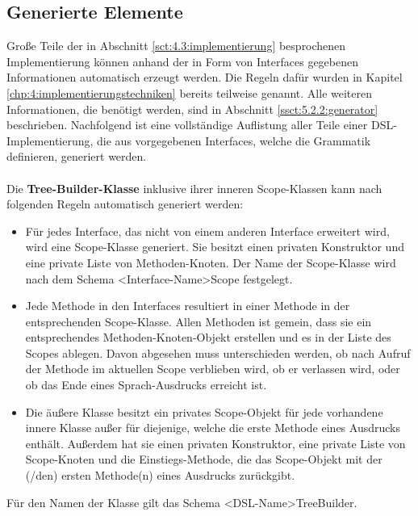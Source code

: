 \subsection{Generierte Elemente}\label{ssct:5.2.1:generiertes}
Große Teile der in Abschnitt \ref{sct:4.3:implementierung} besprochenen Implementierung können anhand der in Form von Interfaces gegebenen Informationen automatisch erzeugt werden. Die Regeln dafür wurden in Kapitel \ref{chp:4:implementierungstechniken} bereits teilweise genannt. Alle weiteren Informationen, die benötigt werden, sind in Abschnitt \ref{ssct:5.2.2:generator} beschrieben.
Nachfolgend ist eine vollständige Auflistung aller Teile einer DSL-Implementierung, die aus vorgegebenen Interfaces, welche die Grammatik definieren, generiert werden.
\\ \\ %
Die \textbf{Tree-Builder-Klasse} inklusive ihrer inneren Scope-Klassen kann nach folgenden Regeln automatisch generiert werden:

\begin{itemize}
	\item Für jedes Interface, das nicht von einem anderen Interface erweitert wird, wird eine Scope-Klasse generiert. Sie besitzt einen privaten Konstruktor und eine private Liste von Methoden-Knoten. Der Name der Scope-Klasse wird nach dem Schema <Interface-Name>Scope festgelegt.
	\item Jede Methode in den Interfaces resultiert in einer Methode in der entsprechenden Scope-Klasse. Allen Methoden ist gemein, dass sie ein entsprechendes Methoden-Knoten-Objekt erstellen und es in der Liste des Scopes ablegen. Davon abgesehen muss unterschieden werden, ob nach Aufruf der Methode im aktuellen Scope verblieben wird, ob er verlassen wird, oder ob das Ende eines Sprach-Ausdrucks erreicht ist.
	\item Die äußere Klasse besitzt ein privates Scope-Objekt für jede vorhandene innere Klasse außer für diejenige, welche die erste Methode eines Ausdrucks enthält. Außerdem hat sie einen privaten Konstruktor, eine private Liste von Scope-Knoten und die Einstiegs-Methode, die das Scope-Objekt mit der (/den) ersten Methode(n) eines Ausdrucks zurückgibt.
\end{itemize}

Für den Namen der Klasse gilt das Schema <DSL-Name>TreeBuilder.\\

